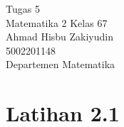 \documentclass{article}
\begin{document}
 \begin{titlepage}
    \vspace*{\fill}
    \begin{center}
      \Huge {Tugas 5 \\ Matematika 2 Kelas 67}\\[0.4cm] 
      \huge {Ahmad Hisbu Zakiyudin \\ 5002201148 \\ Departemen Matematika}\\[0.4cm]
    \end{center}
    \vspace*{\fill}
  \end{titlepage}
\newpage
{}
\section*{Latihan 2.1}
\end{document}
